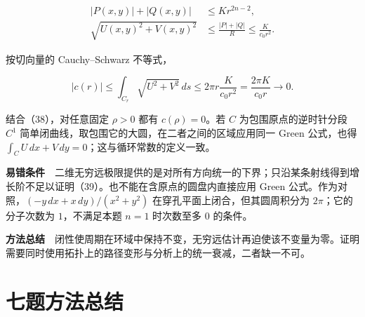 \documentclass[11pt,a4paper]{article}
\begin{document}
\begin{equation}
\begin{aligned}
|P(x,y)|+|Q(x,y)|&\le K r^{2n-2},\\
\sqrt{U(x,y)^2+V(x,y)^2}
&\le\frac{|P|+|Q|}{R}\le\frac{K}{c_0r^2}.
\end{aligned}
\tag{39}
\end{equation}

按切向量的 Cauchy--Schwarz 不等式，

\begin{equation}
|c(r)|\le\int_{C_r}\sqrt{U^2+V^2}\,ds
\le 2\pi r\frac{K}{c_0r^2}
=\frac{2\pi K}{c_0r}\longrightarrow0.
\tag{40}
\end{equation}

结合（38），对任意固定 \(\rho>0\) 都有 \(c(\rho)=0\)。若 \(C\)
为包围原点的逆时针分段 \(C^1\)
简单闭曲线，取包围它的大圆，在二者之间的区域应用同一 Green 公式，也得
\(\int_C U\,dx+V\,dy=0\)；这与循环常数的定义一致。

\textbf{易错条件}　二维无穷远极限提供的是对所有方向统一的下界；只沿某条射线得到增长阶不足以证明（39）。也不能在含原点的圆盘内直接应用
Green 公式。作为对照，\((-y\,dx+x\,dy)/(x^2+y^2)\)
在穿孔平面上闭合，但其圆周积分为 \(2\pi\)；它的分子次数为
\(1\)，不满足本题 \(n=1\) 时次数至多 \(0\) 的条件。

\textbf{方法总结}　闭性使周期在环域中保持不变，无穷远估计再迫使该不变量为零。证明需要同时使用拓扑上的路径变形与分析上的统一衰减，二者缺一不可。

\section{七题方法总结}\label{ux4e03ux9898ux65b9ux6cd5ux603bux7ed3}
\end{document}
